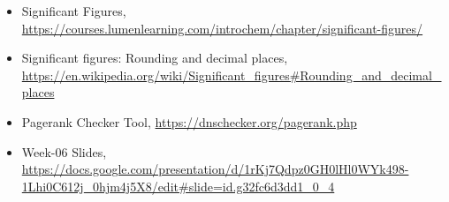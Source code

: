 \documentclass[12pt]{article}
\begin{document}
\begin{itemize}
    \item { Significant Figures, \url{ https://courses.lumenlearning.com/introchem/chapter/significant-figures/ }}
    \item { Significant figures: Rounding and decimal places, \url{ https://en.wikipedia.org/wiki/Significant_figures#Rounding_and_decimal_places }}
    \item { Pagerank Checker Tool, \url{https://dnschecker.org/pagerank.php }}
    \item { Week-06 Slides, \url{ https://docs.google.com/presentation/d/1rKj7Qdpz0GH0lHl0WYk498-1Lhi0C612j_0hjm4j5X8/edit#slide=id.g32fc6d3dd1_0_4 }}
    
    
\end{itemize}
\end{document}
